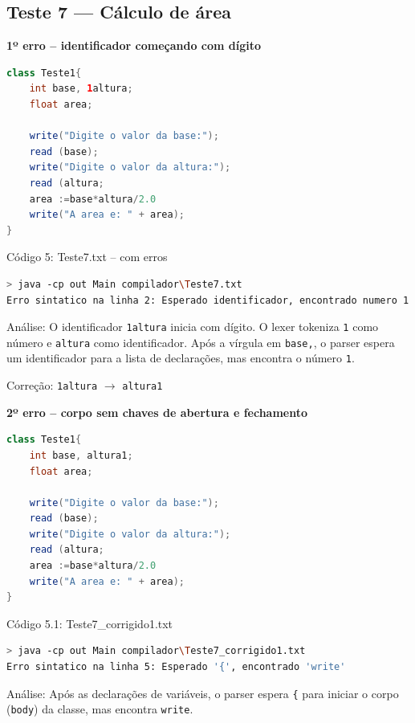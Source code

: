 \documentclass[12pt,a4paper]{article}
\begin{document}
\subsection{Teste 7 --- Cálculo de área}

\textbf{1º erro -- identificador começando com dígito}

\begin{lstlisting}[language=Java]
class Teste1{
    int base, 1altura;
    float area;

    write("Digite o valor da base:");
    read (base);
    write("Digite o valor da altura:");
    read (altura;
    area :=base*altura/2.0
    write("A area e: " + area);
}
\end{lstlisting}

Código 5: Teste7.txt -- com erros

\begin{lstlisting}[language=bash]
> java -cp out Main compilador\Teste7.txt
Erro sintatico na linha 2: Esperado identificador, encontrado numero 1
\end{lstlisting}

Análise: O identificador \texttt{1altura} inicia com dígito. O lexer tokeniza \texttt{1} como número e \texttt{altura} como identificador. Após a vírgula em \texttt{base,}, o parser espera um identificador para a lista de declarações, mas encontra o número \texttt{1}.

Correção: \texttt{1altura} $\to$ \texttt{altura1}

\textbf{2º erro -- corpo sem chaves de abertura e fechamento}

\begin{lstlisting}[language=Java]
class Teste1{
    int base, altura1;
    float area;

    write("Digite o valor da base:");
    read (base);
    write("Digite o valor da altura:");
    read (altura;
    area :=base*altura/2.0
    write("A area e: " + area);
}
\end{lstlisting}

Código 5.1: Teste7\_corrigido1.txt

\begin{lstlisting}[language=bash]
> java -cp out Main compilador\Teste7_corrigido1.txt
Erro sintatico na linha 5: Esperado '{', encontrado 'write'
\end{lstlisting}

Análise: Após as declarações de variáveis, o parser espera \texttt{\{} para iniciar o corpo (\texttt{body}) da classe, mas encontra \texttt{write}.
\end{document}
